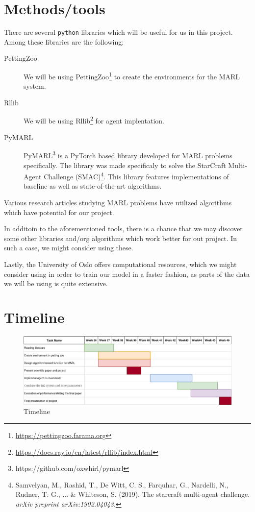 \documentclass{article}
\begin{document}
\section{Methods/tools}
There are several \texttt{python} libraries which will be useful for us in this project.
Among these libraries are the following:
\begin{description}
  \item[PettingZoo] We will be using PettingZoo\footnote[1]{\url{https://pettingzoo.farama.org}}
    to create the environments for the MARL system.
  \item[Rllib] We will be using Rllib\footnote[2]{\url{https://docs.ray.io/en/latest/rllib/index.html}}
    for agent implentation.
  \item[PyMARL] PyMARL\footnote[3]{https://github.com/oxwhirl/pymarl} is a PyTorch based library
    developed for MARL problems specifically. The library was made specificaly to solve the StarCraft
    Multi-Agent Challenge (SMAC)\footnote[4]{Samvelyan, M., Rashid, T., De Witt, C. S., Farquhar, G., Nardelli, N., Rudner, T. G., ... \& Whiteson, S. (2019). The starcraft multi-agent challenge. \textit{arXiv preprint arXiv:1902.04043}.}. %
    This library features implementations of baseline as well as state-of-the-art algorithms.
\end{description}

\noindent
Various research articles studying MARL problems have utilized algorithms which have potential for our
project.

\noindent
In additoin to the aforementioned tools, there is a chance that we may discover some other libraries and/org
algorithms which work better for out project. In such a case, we might consider using these.

\noindent
Lastly, the University of Oslo offers computational resources, which we might consider using in order to
train our model in a faster fashion, as parts of the data we will be using is quite extensive.

\section{Timeline}
\begin{figure}[h]
    \begin{center}
        \includegraphics[width=\textwidth]{Timeline.png}
    \end{center}
    \caption{Timeline}
    \label{fig:timeline}
\end{figure}
\end{document}
